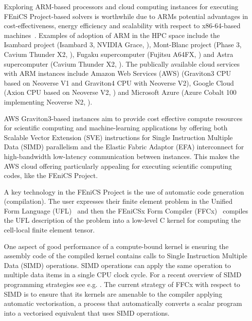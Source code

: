 Exploring ARM-based processors and cloud computing instances for executing
FEniCS Project-based solvers is worthwhile due to ARMs potential advantages in
cost-effectiveness, energy efficiency and scalability with respect to
x86-64-based machines~\cite{simakov_are_2023,suarez_comprehensive_2024}.
Examples of adoption of ARM in the HPC space include the Isambard project
(Isambard 3, NVIDIA Grace, \citep{isambard}), Mont-Blanc project (Phase 3,
Cavium Thunder X2, \citep{Rajovic2016}), Fugaku supercomputer (Fujitsu A64FX,
\citep{fugaku}) and Astra supercomputer (Cavium Thunder X2, \citep{astra}). The
publically available cloud services with ARM instances include Amazon Web
Services (AWS) (Graviton3 CPU based on Neoverse V1 and Graviton4 CPU with
Neoverse V2), Google Cloud (Axion CPU based on Neoverse V2,
\citep{google_arm_compute}) and Microsoft Azure (Azure Cobalt 100 implementing
Neoverse N2, \citep{microsoft_azure}).

AWS Graviton3-based instances aim to provide cost effective compute resources
for scientific computing and machine-learning applications by offering both
Scalable Vector Extension (SVE) instructions for Single Instruction Multiple
Data (SIMD) parallelism and the Elastic Fabric Adaptor (EFA) interconnect for
high-bandwidth low-latency communication between instances. This makes the AWS
cloud offering particularly appealing for executing scientific computing codes,
like the FEniCS Project.

A key technology in the FEniCS Project is the use of automatic code generation
(compilation). The user expresses their finite element problem in the Unified
Form Language (UFL)~\citep{alnaes_unified_2014} and then the FEniCSx Form
Compiler (FFCx)~\citep{kirby_compiler_2006} compiles the UFL description of the
problem into a low-level C kernel for computing the cell-local finite element
tensor.

One aspect of good performance of a compute-bound kernel is ensuring the
assembly code of the compiled kernel contains calls to Single Instruction
Multiple Data (SIMD) operations. SIMD operations can apply the same operation
to multiple data items in a single CPU clock cycle. For a recent overview of
SIMD programming strategies see e.g. \citep{rocke_evaluation_2023}. The current
strategy of FFCx with respect to SIMD is to ensure that its kernels are
amenable to the compiler applying automatic vectorisation, a process that
automatically converts a scalar program into a vectorised equivalent that uses
SIMD operations.
 
